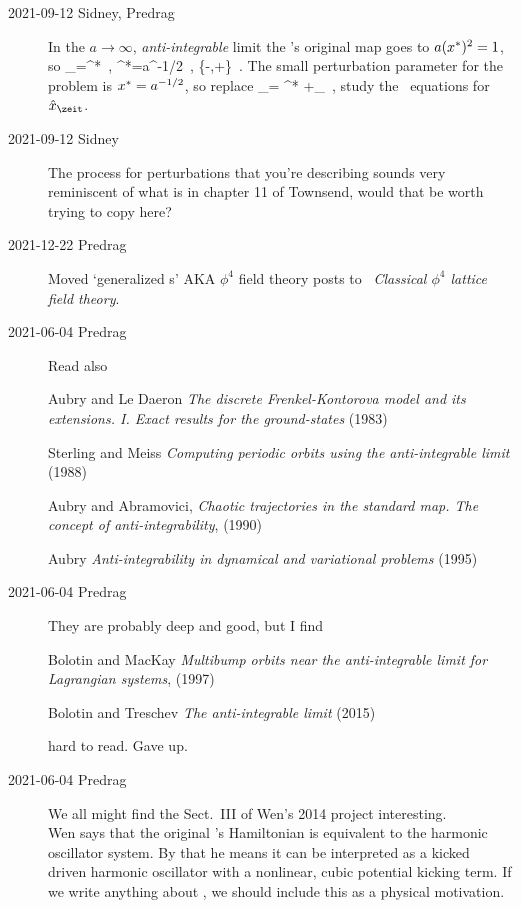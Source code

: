 \begin{description}
\item[2021-09-12 Sidney, Predrag]
In the $a\rightarrow\infty$, \emph{anti-integrable} limit
the \Henon's original map
 goes to $a(x^*)^2=1$,
so
\beq
\ssp_\zeit=\Ssym{\zeit}\ssp^*
    \,,\qquad
\ssp^*=a^{-1/2}
    \,,\quad
\Ssym{\zeit}\in\{-,+\}
\,.
The small perturbation parameter for the problem is
$x^*=a^{-1/2}$, so replace
\beq
\ssp_\zeit = \Ssym{\zeit}\ssp^* +\hat{\ssp}_\zeit
\,,
study the \henlatt\ equations for $\hat{\ssp}_\zeit$.

\item[2021-09-12 Sidney]
The process for perturbations that you're describing sounds very
reminiscent of what is in chapter 11 of Townsend, would that be worth
trying to copy here?

\item[2021-12-22 Predrag]
Moved `generalized {\HenonMap}s' AKA $\phi^4$ field theory posts to
~{\em Classical {$\phi^4$} lattice field theory}.

\item[2021-06-04 Predrag]
Read also

Aubry and Le Daeron
{\em The discrete {Frenkel-Kontorova} model and its extensions.
{I}. {Exact} results for the ground-states} (1983)

Sterling and Meiss
{\em Computing periodic orbits using the anti-integrable limit}  (1988)

Aubry and Abramovici,
{\em Chaotic trajectories in the standard map.
{The} concept of anti-integrability},
(1990)

Aubry
  {\em Anti-integrability in dynamical and variational problems} (1995)

\item[2021-06-04 Predrag]
They are probably deep and good, but I find

Bolotin and MacKay
{\em Multibump orbits near the anti-integrable limit for {Lagrangian} systems},
(1997)

Bolotin and Treschev
{\em The anti-integrable limit} (2015)

hard to read. Gave up.


\item[2021-06-04 Predrag]
We all might find the Sect.~III of {Wen's 2014 project}
 interesting.
\\
Wen says that the original \Henon's Hamiltonian {\HenonMap} is
equivalent to the harmonic oscillator system. By that he means it can be
interpreted as a kicked driven harmonic oscillator with a nonlinear,
cubic potential kicking term. If we write anything about \henlatt, we
should include this as a physical motivation.


\end{description}
